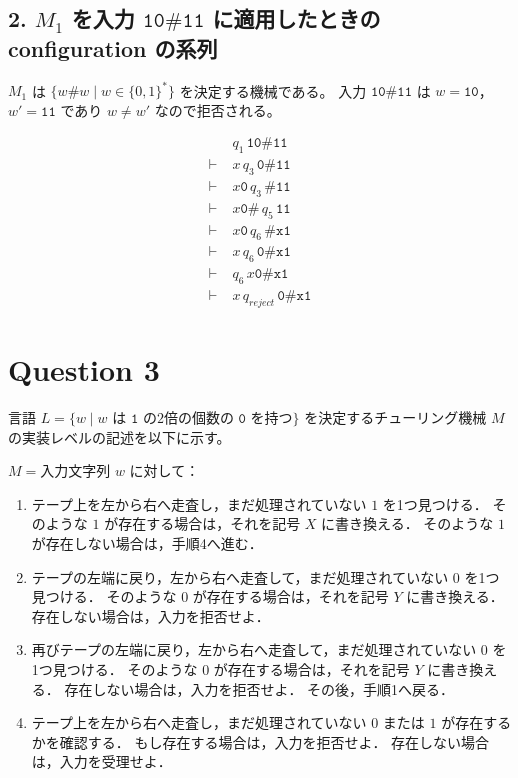 \documentclass[uplatex,a4paper,11pt]{jsarticle}
\begin{document}
\subsection*{2. $M_1$ を入力 $\mathtt{10\#11}$ に適用したときの configuration の系列}

$M_1$ は $\{w\#w \mid w \in \{0,1\}^*\}$ を決定する機械である。
入力 $\mathtt{10\#11}$ は $w=\mathtt{10}$，$w'=\mathtt{11}$ であり $w \neq w'$ なので拒否される。

\begin{align*}
&q_1\,\mathtt{10\#11} \\
\vdash\; &x\,q_3\,\mathtt{0\#11} \\
\vdash\; &x\mathtt{0}\,q_3\,\mathtt{\#11} \\
\vdash\; &x\mathtt{0\#}\,q_5\,\mathtt{11} \\
\vdash\; &x\mathtt{0}\,q_6\,\mathtt{\#x1} \\
\vdash\; &x\,q_6\,\mathtt{0\#x1} \\
\vdash\; &q_6\,x\mathtt{0\#x1} \\
\vdash\; &x\,q_{reject}\,\mathtt{0\#x1}
\end{align*}


\section*{Question 3}

言語 $L = \{w \mid w \text{ は } \mathtt{1} \text{ の2倍の個数の } \mathtt{0} \text{ を持つ}\}$
を決定するチューリング機械 $M$ の実装レベルの記述を以下に示す。

\noindent
$M =$入力文字列 $w$ に対して：

\begin{enumerate}
  \item テープ上を左から右へ走査し，まだ処理されていない $1$ を1つ見つける．
  そのような $1$ が存在する場合は，それを記号 $X$ に書き換える．
  そのような $1$ が存在しない場合は，手順4へ進む．

  \item テープの左端に戻り，左から右へ走査して，まだ処理されていない $0$ を1つ見つける．
  そのような $0$ が存在する場合は，それを記号 $Y$ に書き換える．
  存在しない場合は，入力を拒否せよ．

  \item 再びテープの左端に戻り，左から右へ走査して，まだ処理されていない $0$ を1つ見つける．
  そのような $0$ が存在する場合は，それを記号 $Y$ に書き換える．
  存在しない場合は，入力を拒否せよ．
  その後，手順1へ戻る．

  \item テープ上を左から右へ走査し，まだ処理されていない $0$ または $1$ が存在するかを確認する．
  もし存在する場合は，入力を拒否せよ．
  存在しない場合は，入力を受理せよ．
\end{enumerate}
\end{document}
